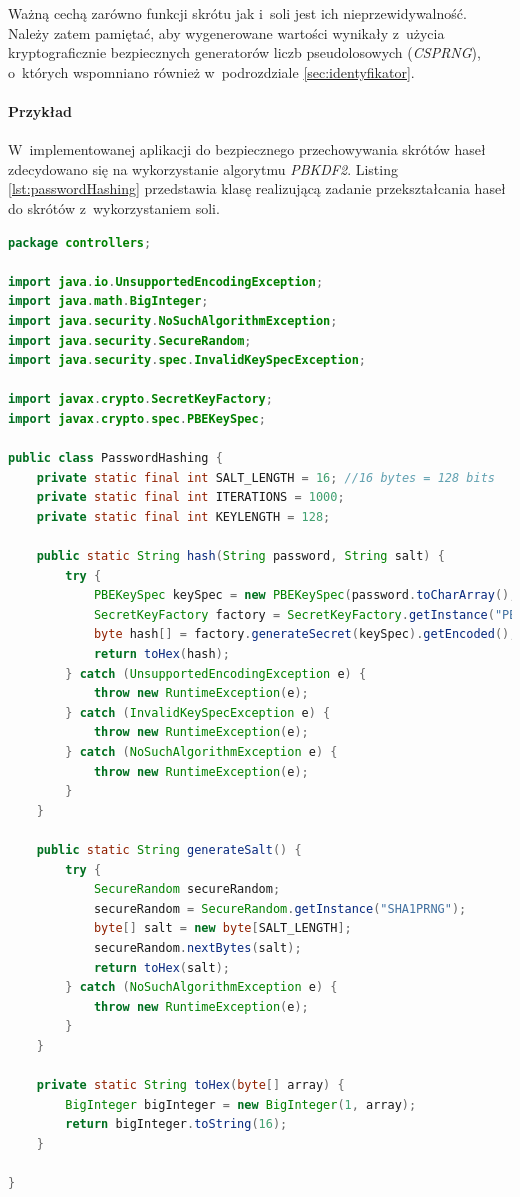 \documentclass[11pt]{aghdpl}
\begin{document}
Ważną cechą zarówno funkcji skrótu jak i~soli jest ich nieprzewidywalność. Należy zatem pamiętać, aby wygenerowane wartości wynikały z~użycia kryptograficznie bezpiecznych generatorów liczb pseudolosowych (\emph{CSPRNG}), o~których wspomniano również w~podrozdziale \ref{sec:identyfikator}.

\paragraph{Przykład}

W~implementowanej aplikacji do bezpiecznego przechowywania skrótów haseł zdecydowano się na wykorzystanie algorytmu \emph{PBKDF2}. Listing \ref{lst:passwordHashing} przedstawia klasę realizującą zadanie przekształcania haseł do skrótów z~wykorzystaniem soli.

\begin{lstlisting}[language=Java, caption={Klasa realizująca przekształcanie haseł do skrótów z~wykorzystaniem soli.}, label={lst:passwordHashing}]
package controllers;

import java.io.UnsupportedEncodingException;
import java.math.BigInteger;
import java.security.NoSuchAlgorithmException;
import java.security.SecureRandom;
import java.security.spec.InvalidKeySpecException;

import javax.crypto.SecretKeyFactory;
import javax.crypto.spec.PBEKeySpec;

public class PasswordHashing {
	private static final int SALT_LENGTH = 16; //16 bytes = 128 bits
	private static final int ITERATIONS = 1000;
	private static final int KEYLENGTH = 128;

	public static String hash(String password, String salt) {
		try {
			PBEKeySpec keySpec = new PBEKeySpec(password.toCharArray(), salt.getBytes("UTF-8"), ITERATIONS, KEYLENGTH);
			SecretKeyFactory factory = SecretKeyFactory.getInstance("PBKDF2WithHmacSHA1");
			byte hash[] = factory.generateSecret(keySpec).getEncoded();
			return toHex(hash);
		} catch (UnsupportedEncodingException e) {
			throw new RuntimeException(e);
		} catch (InvalidKeySpecException e) {
			throw new RuntimeException(e);
		} catch (NoSuchAlgorithmException e) {
			throw new RuntimeException(e);
		}
	}

	public static String generateSalt() {
		try {
			SecureRandom secureRandom;
			secureRandom = SecureRandom.getInstance("SHA1PRNG");
			byte[] salt = new byte[SALT_LENGTH];
			secureRandom.nextBytes(salt);
			return toHex(salt);
		} catch (NoSuchAlgorithmException e) {
			throw new RuntimeException(e);
		}
	}
	
	private static String toHex(byte[] array) {
		BigInteger bigInteger = new BigInteger(1, array);
		return bigInteger.toString(16);
	}
	
}
\end{lstlisting}
\end{document}
